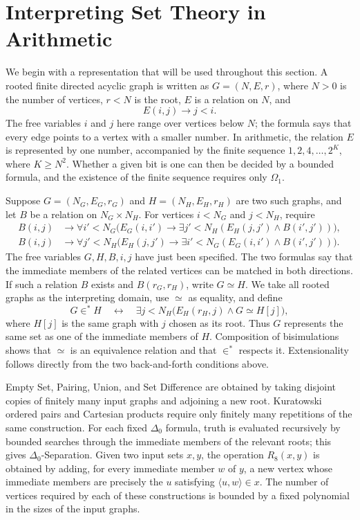 \documentclass[11pt,a4paper]{article}
\theoremstyle{plain}
\theoremstyle{definition}
\theoremstyle{remark}
\begin{document}
\section{Interpreting Set Theory in Arithmetic}
\label{sec:upper}

We begin with a representation that will be used throughout this section. A rooted finite directed acyclic graph is written as \(G=(N,E,r)\), where \(N>0\) is the number of vertices, \(r<N\) is the root, \(E\) is a relation on \(N\), and
\[
 E(i,j)\longrightarrow j<i.
\]
The free variables \(i\) and \(j\) here range over vertices below \(N\); the formula says that every edge points to a vertex with a smaller number. In arithmetic, the relation \(E\) is represented by one number, accompanied by the finite sequence
\(1,2,4,\ldots,2^K\), where \(K\geq N^2\). Whether a given bit is one can then be decided by a bounded formula, and the existence of the finite sequence requires only \(\Omega_1\).

Suppose \(G=(N_G,E_G,r_G)\) and \(H=(N_H,E_H,r_H)\) are two such graphs, and let \(B\) be a relation on \(N_G\times N_H\). For vertices \(i<N_G\) and \(j<N_H\), require
\begin{align*}
B(i,j)&\longrightarrow
 \forall i'<N_G\bigl(E_G(i,i')\to
   \exists j'<N_H(E_H(j,j')\wedge B(i',j'))\bigr),\\
B(i,j)&\longrightarrow
 \forall j'<N_H\bigl(E_H(j,j')\to
   \exists i'<N_G(E_G(i,i')\wedge B(i',j'))\bigr).
\end{align*}
The free variables \(G,H,B,i,j\) have just been specified. The two formulas say that the immediate members of the related vertices can be matched in both directions. If such a relation \(B\) exists and \(B(r_G,r_H)\), write \(G\simeq H\). We take all rooted graphs as the interpreting domain, use \(\simeq\) as equality, and define
\[
 G\in^*H\quad\longleftrightarrow\quad
 \exists j<N_H\bigl(E_H(r_H,j)\wedge G\simeq H[j]\bigr),
\]
where \(H[j]\) is the same graph with \(j\) chosen as its root. Thus \(G\) represents the same set as one of the immediate members of \(H\). Composition of bisimulations shows that \(\simeq\) is an equivalence relation and that \(\in^*\) respects it. Extensionality follows directly from the two back-and-forth conditions above.

Empty Set, Pairing, Union, and Set Difference are obtained by taking disjoint copies of finitely many input graphs and adjoining a new root. Kuratowski ordered pairs and Cartesian products require only finitely many repetitions of the same construction. For each fixed \(\Delta_0\) formula, truth is evaluated recursively by bounded searches through the immediate members of the relevant roots; this gives \(\Delta_0\)-Separation. Given two input sets \(x,y\), the operation \(R_8(x,y)\) is obtained by adding, for every immediate member \(w\) of \(y\), a new vertex whose immediate members are precisely the \(u\) satisfying \(\langle u,w\rangle\in x\). The number of vertices required by each of these constructions is bounded by a fixed polynomial in the sizes of the input graphs.
\end{document}
